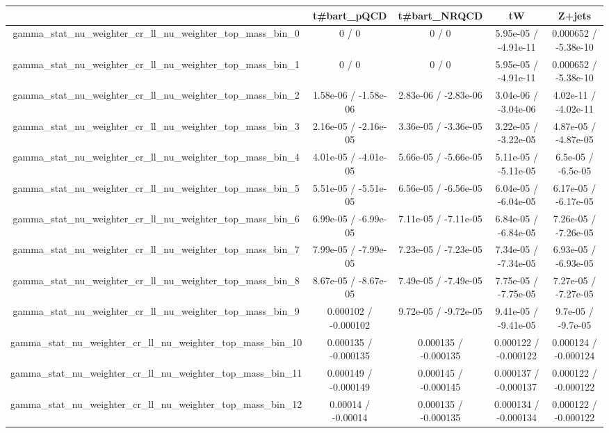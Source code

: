 \documentclass[10pt]{article}
\begin{document}
\begin{table}[htbp]
\begin{center}
\begin{tabular}{|c|c|c|c|c|}
\hline 
      & t#bar{t}_{pQCD}      & t#bar{t}_{NRQCD}      & tW      & Z+jets \\ 
\hline 
  gamma_stat_nu_weighter_cr_ll_nu_weighter_top_mass_bin_0 & 0 / 0 & 0 / 0 & 5.95e-05 / -4.91e-11 & 0.000652 / -5.38e-10 \\ 
  gamma_stat_nu_weighter_cr_ll_nu_weighter_top_mass_bin_1 & 0 / 0 & 0 / 0 & 5.95e-05 / -4.91e-11 & 0.000652 / -5.38e-10 \\ 
  gamma_stat_nu_weighter_cr_ll_nu_weighter_top_mass_bin_2 & 1.58e-06 / -1.58e-06 & 2.83e-06 / -2.83e-06 & 3.04e-06 / -3.04e-06 & 4.02e-11 / -4.02e-11 \\ 
  gamma_stat_nu_weighter_cr_ll_nu_weighter_top_mass_bin_3 & 2.16e-05 / -2.16e-05 & 3.36e-05 / -3.36e-05 & 3.22e-05 / -3.22e-05 & 4.87e-05 / -4.87e-05 \\ 
  gamma_stat_nu_weighter_cr_ll_nu_weighter_top_mass_bin_4 & 4.01e-05 / -4.01e-05 & 5.66e-05 / -5.66e-05 & 5.11e-05 / -5.11e-05 & 6.5e-05 / -6.5e-05 \\ 
  gamma_stat_nu_weighter_cr_ll_nu_weighter_top_mass_bin_5 & 5.51e-05 / -5.51e-05 & 6.56e-05 / -6.56e-05 & 6.04e-05 / -6.04e-05 & 6.17e-05 / -6.17e-05 \\ 
  gamma_stat_nu_weighter_cr_ll_nu_weighter_top_mass_bin_6 & 6.99e-05 / -6.99e-05 & 7.11e-05 / -7.11e-05 & 6.84e-05 / -6.84e-05 & 7.26e-05 / -7.26e-05 \\ 
  gamma_stat_nu_weighter_cr_ll_nu_weighter_top_mass_bin_7 & 7.99e-05 / -7.99e-05 & 7.23e-05 / -7.23e-05 & 7.34e-05 / -7.34e-05 & 6.93e-05 / -6.93e-05 \\ 
  gamma_stat_nu_weighter_cr_ll_nu_weighter_top_mass_bin_8 & 8.67e-05 / -8.67e-05 & 7.49e-05 / -7.49e-05 & 7.75e-05 / -7.75e-05 & 7.27e-05 / -7.27e-05 \\ 
  gamma_stat_nu_weighter_cr_ll_nu_weighter_top_mass_bin_9 & 0.000102 / -0.000102 & 9.72e-05 / -9.72e-05 & 9.41e-05 / -9.41e-05 & 9.7e-05 / -9.7e-05 \\ 
  gamma_stat_nu_weighter_cr_ll_nu_weighter_top_mass_bin_10 & 0.000135 / -0.000135 & 0.000135 / -0.000135 & 0.000122 / -0.000122 & 0.000124 / -0.000124 \\ 
  gamma_stat_nu_weighter_cr_ll_nu_weighter_top_mass_bin_11 & 0.000149 / -0.000149 & 0.000145 / -0.000145 & 0.000137 / -0.000137 & 0.000122 / -0.000122 \\ 
  gamma_stat_nu_weighter_cr_ll_nu_weighter_top_mass_bin_12 & 0.00014 / -0.00014 & 0.000135 / -0.000135 & 0.000134 / -0.000134 & 0.000122 / -0.000122 \\ 

\end{tabular}
\end{center}
\end{table}
\end{document}

